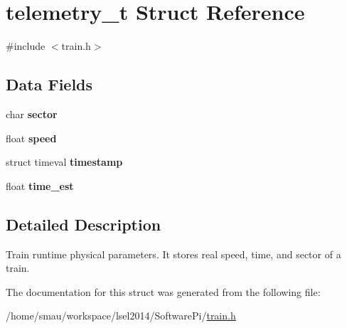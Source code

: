 \hypertarget{structtelemetry__t}{\section{telemetry\-\_\-t Struct Reference}
\label{structtelemetry__t}
}


{\ttfamily \#include $<$train.\-h$>$}

\subsection*{Data Fields}
\begin{DoxyCompactItemize}
\item 
\hypertarget{structtelemetry__t_a9a7ab9e5921f6a66a60c64dc69bb8414}{char {\bfseries sector}}\label{structtelemetry__t_a9a7ab9e5921f6a66a60c64dc69bb8414}

\item 
\hypertarget{structtelemetry__t_a5d83531eda868eb68af5fc94b550906a}{float {\bfseries speed}}\label{structtelemetry__t_a5d83531eda868eb68af5fc94b550906a}

\item 
\hypertarget{structtelemetry__t_a5e49bfa2b771f0be3c0c94ec87633b6d}{struct timeval {\bfseries timestamp}}\label{structtelemetry__t_a5e49bfa2b771f0be3c0c94ec87633b6d}

\item 
\hypertarget{structtelemetry__t_add3308a17651cf844f92bb8491d692ba}{float {\bfseries time\-\_\-est}}\label{structtelemetry__t_add3308a17651cf844f92bb8491d692ba}

\end{DoxyCompactItemize}


\subsection{Detailed Description}
Train runtime physical parameters. It stores real speed, time, and sector of a train. 

The documentation for this struct was generated from the following file\-:\begin{DoxyCompactItemize}
\item 
/home/smau/workspace/lsel2014/\-Software\-Pi/\hyperlink{train_8h}{train.\-h}\end{DoxyCompactItemize}
